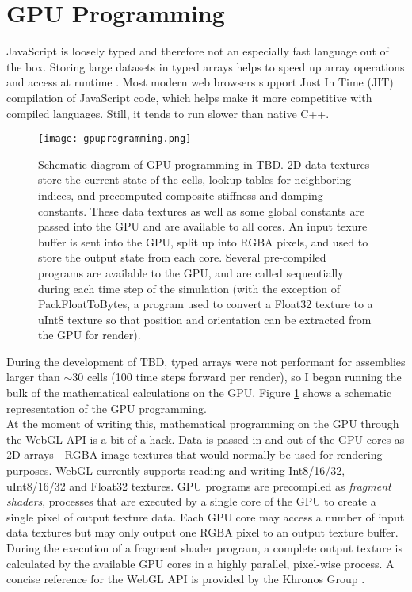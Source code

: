 {\section{GPU Programming}

JavaScript is loosely typed and therefore not an especially fast language out of the box.  Storing large datasets in typed arrays helps to speed up array operations and access at runtime \cite{Network}.  Most modern web browsers support Just In Time (JIT) compilation of JavaScript code, which helps make it more competitive with compiled languages.    Still, it tends to run slower than native C++.\\

\begin{figure}
  \texttt{[image: gpuprogramming.png]}
  \caption{Schematic diagram of GPU programming in TBD.  2D data textures store the current state of the cells, lookup tables for neighboring indices, and precomputed composite stiffness and damping constants.  These data textures as well as some global constants are passed into the GPU and are available to all cores.  An input texure buffer is sent into the GPU, split up into RGBA pixels, and used to store the output state from each core.  Several pre-compiled programs are available to the GPU, and are called sequentially during each time step of the simulation (with the exception of PackFloatToBytes, a program used to convert a Float32 texture to a uInt8 texture so that position and orientation can be extracted from the GPU for render).}
  \label{fig:gpuprogramming}
\end{figure}

During the development of TBD, typed arrays were not performant for assemblies larger than $\sim$30 cells (100 time steps forward per render), so I began running the bulk of the mathematical calculations on the GPU.  Figure \ref{fig:gpuprogramming} shows a schematic representation of the GPU programming.\\

At the moment of writing this, mathematical programming on the GPU through the WebGL API is a bit of a hack.  Data is passed in and out of the GPU cores as 2D arrays - RGBA image textures that would normally be used for rendering purposes.  WebGL currently supports reading and writing Int8/16/32, uInt8/16/32 and Float32 textures.  GPU programs are precompiled as \textit{fragment shaders}, processes that are executed by a single core of the GPU to create a single pixel of output texture data.  Each GPU core may access a number of input data textures but may only output one RGBA pixel to an output texture buffer.  During the execution of a fragment shader program, a complete output texture is calculated by the available GPU cores in a highly parallel, pixel-wise process.  A concise reference for the WebGL API is provided by the Khronos Group \cite{Group}.\\

}
